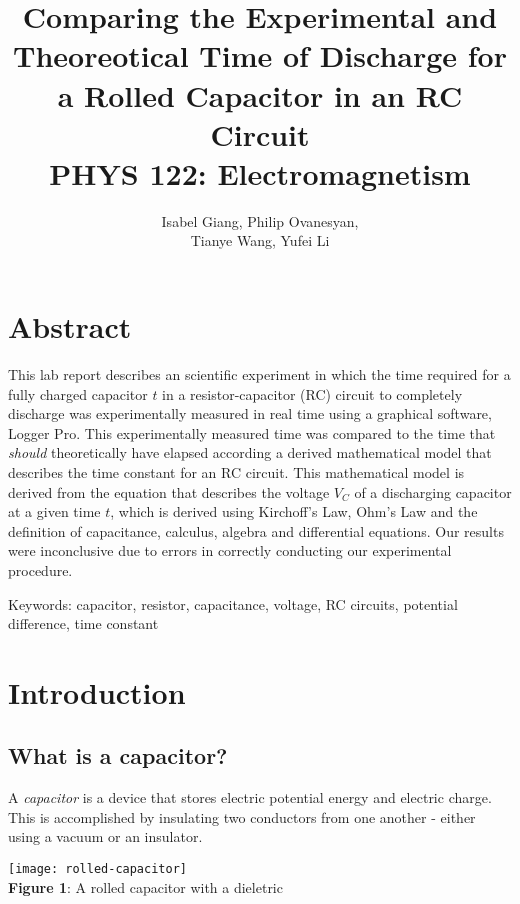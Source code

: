 \documentclass[12pt]{article}
\title{\textbf{Comparing the Experimental and Theoreotical Time of Discharge for a Rolled Capacitor in an RC Circuit} \\ \Large PHYS 122: Electromagnetism}
\author{Isabel Giang, Philip Ovanesyan, \\ Tianye Wang, Yufei Li}
\begin{document}
\begin{titlepage}
\maketitle
\end{titlepage}

\pagebreak


\section*{\centering Abstract}

This lab report describes an scientific experiment in which  the time required for a fully charged capacitor $t$ in a resistor-capacitor (RC) circuit to completely discharge was experimentally measured in real time using a graphical software, Logger Pro. This experimentally measured time was compared to the time that \emph{should} theoretically have elapsed according a derived mathematical model that describes the time constant for an RC circuit. This mathematical model is derived from the equation that describes the voltage $V_C$ of a discharging capacitor at a given time $t$, which is derived using Kirchoff's Law, Ohm's Law and the definition of capacitance, calculus, algebra and differential equations. Our results were inconclusive due to errors in correctly conducting our experimental procedure.


Keywords: capacitor, resistor, capacitance, voltage, RC circuits, potential difference, time constant
\pagebreak

\tableofcontents
\pagebreak

\section*{\centering Introduction}

\subsection*{What is a capacitor?}

A \emph{capacitor} is a device that stores electric potential energy and electric charge. This is accomplished by insulating two conductors from one another - either using a vacuum or an insulator. 


\begin{center} \texttt{[image: rolled-capacitor]} 
\\ \footnotesize \textbf{Figure 1}: A rolled capacitor with a dieletric \end{center}
\end{document}
